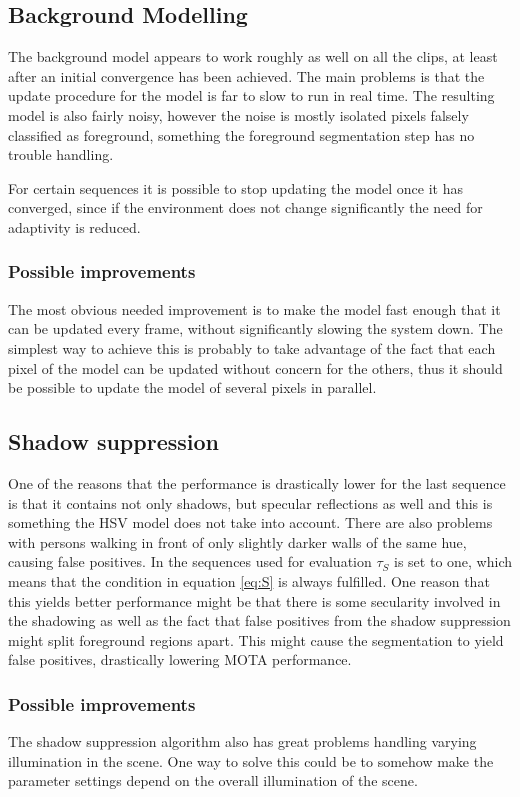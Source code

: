 
\subsection{Background Modelling}
The background model appears to work roughly as well on all the clips, at least after an initial convergence has been achieved. The main problems is that the update procedure for the model is far to slow to run in real time. The resulting model is also fairly noisy, however the noise is mostly isolated pixels falsely classified as foreground, something the foreground segmentation step has no trouble handling.

For certain sequences it is possible to stop updating the model once it has converged, since if the environment does not change significantly the need for adaptivity is reduced.

\subsubsection{Possible improvements}
The most obvious needed improvement is to make the model fast enough that it can be updated every frame, without significantly slowing the system down. The simplest way to achieve this is probably to take advantage of the fact that each pixel of the model can be updated without concern for the others, thus it should be possible to update the model of several pixels in parallel.

\subsection{Shadow suppression}
One of the reasons that the performance is drastically lower for the last sequence is that it contains not only shadows, but specular reflections as well and this is something the HSV model does not take into account. There are also problems with persons walking in front of only slightly darker walls of the same hue, causing false positives. In the sequences used for evaluation $\tau_S$ is set to one, which means that the condition in equation \eqref{eq:S} is always fulfilled. One reason that this yields better performance might be that there is some secularity involved in the shadowing as well as the fact that false positives from the shadow suppression might split foreground regions apart. This might cause the segmentation to yield false positives, drastically lowering MOTA performance.

\subsubsection{Possible improvements}
The shadow suppression algorithm also has great problems handling varying illumination in the scene. One way to solve this could be to somehow make the parameter settings depend on the overall illumination of the scene. 

